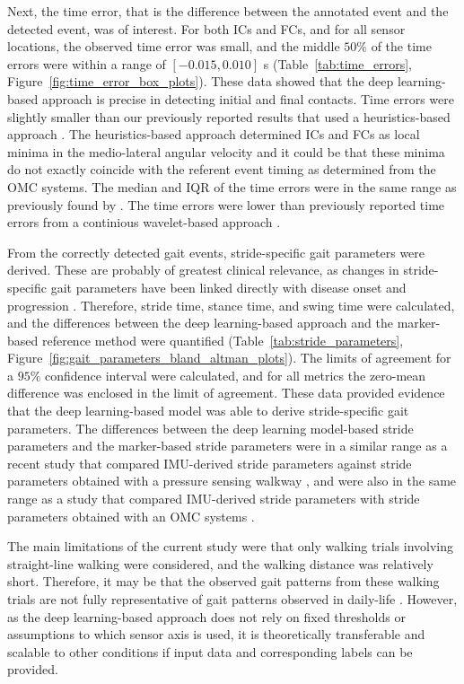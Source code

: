 \documentclass[sensors,article,submit,pdftex,moreauthors]{Definitions/mdpi}
\begin{document}
Next, the time error, that is the difference between the annotated event and the detected event, was of interest. For both ICs and FCs, and for all sensor locations, the observed time error was small, and the middle $50\%$ of the time errors were within a range of $\left[-0.015,0.010\right]$ s (Table~\ref{tab:time_errors}, Figure~\ref{fig:time_error_box_plots}). These data showed that the deep learning-based approach is precise in detecting initial and final contacts. Time errors were slightly smaller than our previously reported results \cite{Romijnders2021} that used a heuristics-based approach \cite{Salarian2004}. The heuristics-based approach determined ICs and FCs as local minima in the medio-lateral angular velocity \cite{Salarian2004} and it could be that these minima do not exactly coincide with the referent event timing as determined from the OMC systems. The median and IQR of the time errors were in the same range as previously found by \cite{Gadaleta2019}. The time errors were lower than previously reported time errors from a continious wavelet-based approach \cite{Ji2019}.

From the correctly detected gait events, stride-specific gait parameters were derived. These are probably of greatest clinical relevance, as changes in stride-specific gait parameters have been linked directly with disease onset and progression \cite{DelDin2019,Koenig2017,Bertoli2018,SchroederVon1995,Mohan2021,Griskevicius2016,Flachenecker2019}. Therefore, stride time, stance time, and swing time were calculated, and the differences between the deep learning-based approach and the marker-based reference method were quantified (Table~\ref{tab:stride_parameters}, Figure~\ref{fig:gait_parameters_bland_altman_plots}). The limits of agreement for a $95\%$ confidence interval were calculated, and for all metrics the zero-mean difference was enclosed in the limit of agreement. These data provided evidence that the deep learning-based model was able to derive stride-specific gait parameters. The differences between the deep learning model-based stride parameters and the marker-based stride parameters were in a similar range as a recent study that compared IMU-derived stride parameters against stride parameters obtained with a pressure sensing walkway \cite{Niswander2021,Gadaleta2019}, and were also in the same range as a study that compared IMU-derived stride parameters with stride parameters obtained with an OMC systems \cite{Carcreff2018}.

The main limitations of the current study were that only walking trials involving straight-line walking were considered, and the walking distance was relatively short. Therefore, it may be that the observed gait patterns from these walking trials are not fully representative of gait patterns observed in daily-life \cite{Hillel2019,Warmerdam2020,Atrsaei2021}. However, as the deep learning-based approach does not rely on fixed thresholds or assumptions to which sensor axis is used, it is theoretically transferable and scalable to other conditions if input data and corresponding labels can be provided. 
\end{document}
